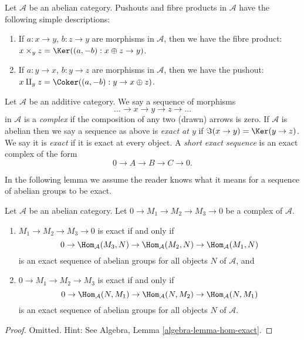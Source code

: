 \begin{example}
\label{example-fibre-product-pushouts}
Let $\mathcal{A}$ be an abelian category.
Pushouts and fibre products in $\mathcal{A}$ have the following
simple descriptions:
\begin{enumerate}
\item If $a : x \to y$, $b : z \to y$ are morphisms in $\mathcal{A}$, then
we have the fibre product:
$x \times_y z = \Ker((a, -b) : x \oplus z \to y)$.
\item If $a : y \to x$, $b : y \to z$ are morphisms in $\mathcal{A}$, then
we have the pushout:
$x \amalg_y z = \Coker((a, -b) : y \to x \oplus z)$.
\end{enumerate}
\end{example}

\begin{definition}
\label{definition-exact}
Let $\mathcal{A}$ be an additive category.
We say a sequence of morphisms
$$
\ldots \to x \to y \to z \to \ldots
$$
in $\mathcal{A}$
is a {\it complex} if the composition of any two (drawn)
arrows is zero. If $\mathcal{A}$ is abelian then
we say a sequence as above is {\it exact at $y$} if
$\Im(x \to y) = \Ker(y \to z)$. We say it is {\it exact}
if it is exact at every object. A {\it short exact sequence}
is an exact complex of the form
$$
0 \to A  \to B \to C \to 0.
$$
\end{definition}

\noindent
In the following lemma we assume the reader knows what it means
for a sequence of abelian groups to be exact.

\begin{lemma}
\label{lemma-check-exactness}
Let $\mathcal{A}$ be an abelian category.
Let $0 \to M_1 \to M_2 \to M_3 \to 0$ be a complex of $\mathcal{A}$.
\begin{enumerate}
\item $M_1 \to M_2 \to M_3 \to 0$ is exact if and only if
$$
0 \to \Hom_\mathcal{A}(M_3, N) \to
\Hom_\mathcal{A}(M_2, N) \to \Hom_\mathcal{A}(M_1, N)
$$
is an exact sequence of abelian groups for all objects $N$ of
$\mathcal{A}$, and
\item $0 \to M_1 \to M_2 \to M_3$ is exact if and only if
$$
0 \to \Hom_\mathcal{A}(N, M_1) \to \Hom_\mathcal{A}(N, M_2) \to
\Hom_\mathcal{A}(N, M_1)
$$
is an exact sequence of abelian groups for all objects $N$ of $\mathcal{A}$.
\end{enumerate}
\end{lemma}

\begin{proof}
Omitted. Hint: See
Algebra, Lemma \ref{algebra-lemma-hom-exact}.
\end{proof}

